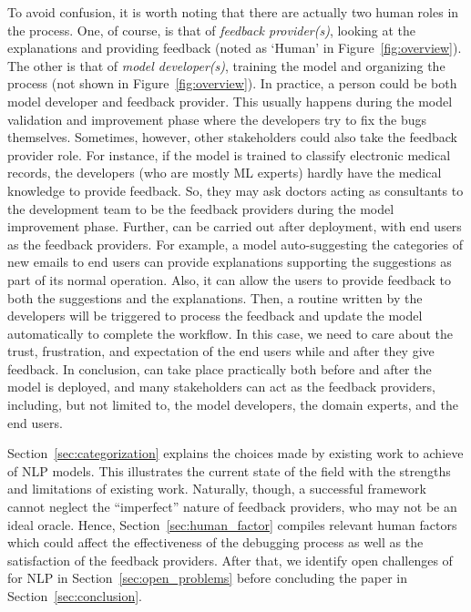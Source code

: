 To avoid confusion, it is worth noting that there are actually two human roles in the \EBHD process. One, of course, is that of 
\textit{feedback provider(s)}, looking at the explanations and providing feedback (noted as `Human' in Figure~\ref{fig:overview}). 
The other is
that of \textit{model developer(s)}, training the model and organizing the \EBHD process (not shown in Figure~\ref{fig:overview}). 
In practice, a person could be both 
model developer and 
feedback provider. This usually happens during the model validation and improvement phase where the developers try to fix the bugs themselves.
Sometimes, however, other stakeholders could also take the feedback provider role.
For instance, if the model is trained to classify electronic medical records, the developers (who are mostly ML experts) hardly have the medical knowledge to provide feedback. So, they may ask doctors acting as consultants to the development team to be the feedback providers during the model improvement phase.
Further, \EBHD can be carried out after deployment, with end users as the feedback providers.
For example, a model auto-suggesting the categories of new emails to end users can provide explanations supporting the suggestions as part of its normal operation. Also, it can allow the users to provide feedback to both the suggestions and the explanations. 
Then, a routine written by the developers will be triggered to process the feedback and update the model automatically to complete the \EBHD workflow.
In this case, we need to care about the trust, frustration, and expectation of the end users while and after they give feedback.
In conclusion, \EBHD can take place practically both before and after the model is deployed, and many stakeholders can act as the feedback providers, including, but not limited to, the model developers, the domain experts, and the end users.

Section~\ref{sec:categorization} explains the choices made by existing work to achieve \EBHD of NLP models. This illustrates the current state of the field with the strengths and limitations of existing work.   
Naturally, though, a successful \EBHD framework cannot neglect the ``imperfect'' nature of feedback providers, who may not be an ideal oracle.
Hence, Section~\ref{sec:human_factor} compiles relevant human factors which could affect the effectiveness of the debugging process as well as the satisfaction of the feedback providers.
After that, we identify open challenges of \EBHD for NLP in Section~\ref{sec:open_problems} before concluding the paper in Section~\ref{sec:conclusion}.

